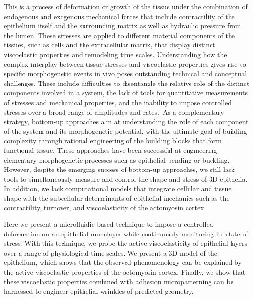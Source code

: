 \documentclass[
]{article}
\begin{document}
This is a process of deformation or growth of the tissue under the
combination of endogenous and exogenous mechanical forces that include
contractility of the epithelium itself and the surrounding matrix as
well as hydraulic pressure from the lumen. These stresses are applied to
different material components of the tissues, such as cells and the
extracellular matrix, that display distinct viscoelastic properties and
remodeling time scales. Understanding how the complex interplay between
tissue stresses and viscoelastic properties gives rise to specific
morphogenetic events in vivo poses outstanding technical and conceptual
challenges. These include difficulties to disentangle the relative role
of the distinct components involved in a system, the lack of tools for
quantitative measurements of stresses and mechanical properties, and the
inability to impose controlled stresses over a broad range of amplitudes
and rates.~As a complementary strategy, bottom-up approaches aim at
understanding the role of each component of the system and its
morphogenetic potential, with the ultimate goal of building complexity
through rational engineering of the building blocks that form functional
tissue. These approaches have been successful at engineering elementary
morphogenetic processes such as epithelial bending or buckling. However,
despite the emerging success of bottom-up approaches, we still lack
tools to simultaneously measure and control the shape and stress of 3D
epithelia. In addition, we lack computational models that integrate
cellular and tissue shape with the subcellular determinants of
epithelial mechanics such as the contractility, turnover, and
viscoelasticity of the actomyosin cortex.

Here we present a microfluidic-based technique to impose a controlled
deformation on an epithelial monolayer while continuously monitoring its
state of stress. With this technique, we probe the active
viscoelasticity of epithelial layers over a range of physiological time
scales. We present a 3D model of the epithelium, which shows that the
observed phenomenology can be explained by the active viscoelastic
properties of the actomyosin cortex. Finally, we show that these
viscoelastic properties combined with adhesion micropatterning can be
harnessed to engineer epithelial wrinkles of predicted geometry.
\end{document}
